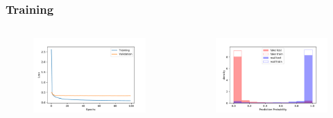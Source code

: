 \documentclass[aspectratio=1610, professionalfonts, 9pt]{beamer}
\begin{document}
  \begin{frame}
    \frametitle{Training}
    \begin{columns}
      \begin{figure}
          \includegraphics[width=\textwidth]{pictures/bow/history_bow_best.pdf}
          \caption{}
          \label{}
      \end{figure}
      
      \begin{figure}
          \includegraphics[width=\textwidth]{pictures/bow/prob_bow_best_nn.pdf}
          \caption{}
          \label{}
      \end{figure}
      
    \end{columns}
  \end{frame}
\end{document}
